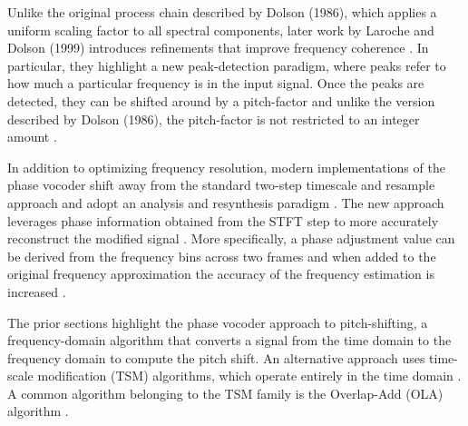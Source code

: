 \documentclass[12pt]{article}
\begin{document}

Unlike the original process chain described by Dolson (1986), 
which applies a uniform scaling factor to all spectral components, 
later work by Laroche and Dolson (1999) introduces refinements that improve 
frequency coherence \cite{laroche1999new}. In particular, they highlight a new 
peak-detection paradigm, where peaks refer to how much a particular frequency 
is in the input signal. Once the peaks are detected, they can be shifted around 
by a pitch-factor and unlike the version described by Dolson (1986), the pitch-factor 
is not restricted to an integer amount \cite{laroche1999new}.
 
In addition to optimizing frequency resolution, modern implementations of the phase vocoder 
shift away from the standard two-step timescale and resample approach and 
adopt an analysis and resynthesis paradigm \cite{degotzen2000traditional}. 
The new approach leverages phase information obtained from the STFT step to more accurately 
reconstruct the modified signal \cite{ degotzen2000traditional}. More specifically, a phase adjustment 
value can be derived from the frequency bins across two frames and when added to the original frequency 
approximation the accuracy of the frequency estimation is increased \cite{lim2007phasevocoder}.



The prior sections highlight the phase vocoder approach to pitch-shifting, a frequency-domain algorithm that 
converts a signal from the time domain to the frequency domain to compute the pitch shift. An alternative approach uses time-scale modification (TSM) algorithms,
which operate entirely in the time domain \cite{rai2019analysis}. 
A common algorithm belonging to the TSM family is the Overlap-Add (OLA) algorithm \cite{royer2019pitch}.
\end{document}
